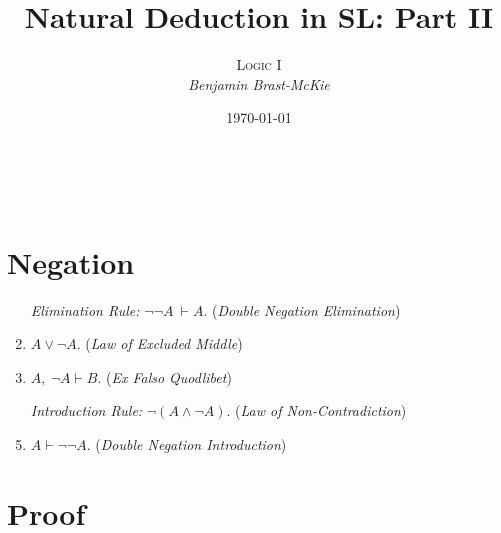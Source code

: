 \documentclass[a4paper, 11pt]{article} %
\title{\textbf{Natural Deduction in SL: Part II}} %
\author{\textsc{Logic I}\\ \em Benjamin Brast-McKie} %
\date{\today} %
\makeatletter
\renewcommand{\maketitle}{ %
\begin{flushright} %
{\LARGE\@title} %

\vspace{10pt} %

{\@author} %
\\\@date %

\vspace{-10pt} %
\end{flushright}
}
\makeatother
\begin{document}
\maketitle %

\thispagestyle{empty}



\section*{Negation}

\begin{enumerate}
  \item[\it Elimination Rule:] $\neg\neg A\ \vdash A$. \quad(\textit{Double Negation Elimination})
  \item $A \vee \neg A$. \quad(\textit{Law of Excluded Middle})
  \item $A,\ \neg A \vdash B$. \quad(\textit{Ex Falso Quodlibet})
  \item[\it Introduction Rule:] $\neg(A \wedge \neg A)$. \quad(\textit{Law of Non-Contradiction})
  \item $A \vdash \neg\neg A$. \quad(\textit{Double Negation Introduction}) 
\end{enumerate}






\section*{Proof}
\end{document}

